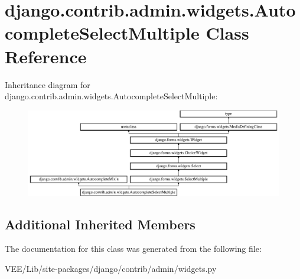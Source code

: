 \hypertarget{classdjango_1_1contrib_1_1admin_1_1widgets_1_1_autocomplete_select_multiple}{}\section{django.\+contrib.\+admin.\+widgets.\+Autocomplete\+Select\+Multiple Class Reference}
\label{classdjango_1_1contrib_1_1admin_1_1widgets_1_1_autocomplete_select_multiple}
Inheritance diagram for django.\+contrib.\+admin.\+widgets.\+Autocomplete\+Select\+Multiple\+:\begin{figure}[H]
\begin{center}
\leavevmode
\includegraphics[height=3.809524cm]{classdjango_1_1contrib_1_1admin_1_1widgets_1_1_autocomplete_select_multiple}
\end{center}
\end{figure}
\subsection*{Additional Inherited Members}


The documentation for this class was generated from the following file\+:\begin{DoxyCompactItemize}
\item 
V\+E\+E/\+Lib/site-\/packages/django/contrib/admin/widgets.\+py\end{DoxyCompactItemize}
